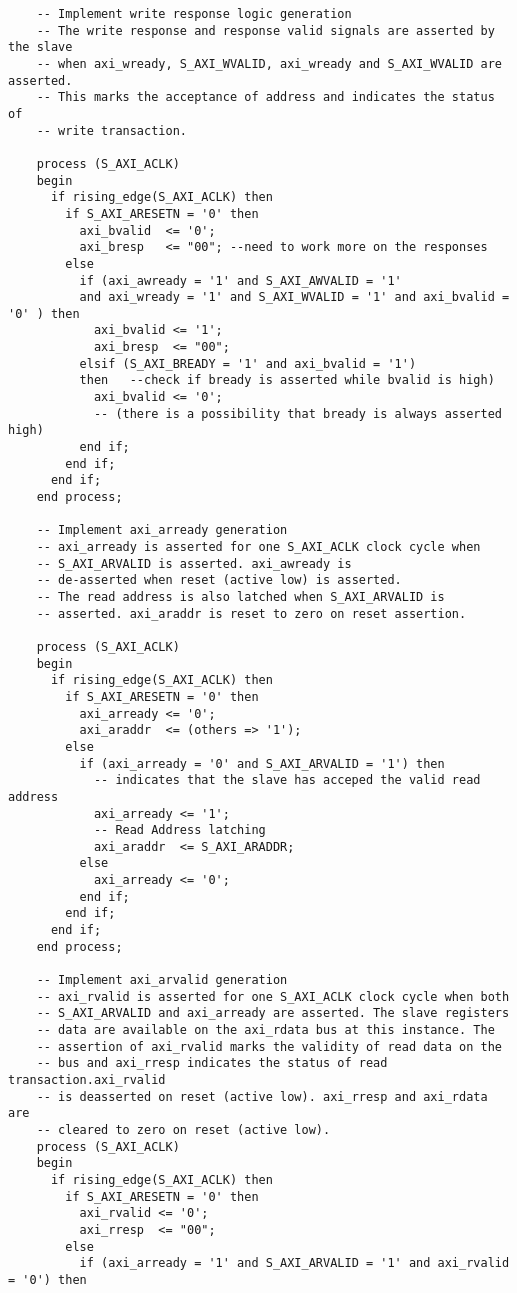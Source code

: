 \begin{lstlisting}
	-- Implement write response logic generation
	-- The write response and response valid signals are asserted by the slave 
	-- when axi_wready, S_AXI_WVALID, axi_wready and S_AXI_WVALID are asserted.  
	-- This marks the acceptance of address and indicates the status of 
	-- write transaction.

	process (S_AXI_ACLK)
	begin
	  if rising_edge(S_AXI_ACLK) then 
	    if S_AXI_ARESETN = '0' then
	      axi_bvalid  <= '0';
	      axi_bresp   <= "00"; --need to work more on the responses
	    else
	      if (axi_awready = '1' and S_AXI_AWVALID = '1' 
          and axi_wready = '1' and S_AXI_WVALID = '1' and axi_bvalid = '0' ) then
	        axi_bvalid <= '1';
	        axi_bresp  <= "00"; 
	      elsif (S_AXI_BREADY = '1' and axi_bvalid = '1') 
          then   --check if bready is asserted while bvalid is high)
	        axi_bvalid <= '0';                                 
            -- (there is a possibility that bready is always asserted high)
	      end if;
	    end if;
	  end if;                   
	end process; 

	-- Implement axi_arready generation
	-- axi_arready is asserted for one S_AXI_ACLK clock cycle when
	-- S_AXI_ARVALID is asserted. axi_awready is 
	-- de-asserted when reset (active low) is asserted. 
	-- The read address is also latched when S_AXI_ARVALID is 
	-- asserted. axi_araddr is reset to zero on reset assertion.

	process (S_AXI_ACLK)
	begin
	  if rising_edge(S_AXI_ACLK) then 
	    if S_AXI_ARESETN = '0' then
	      axi_arready <= '0';
	      axi_araddr  <= (others => '1');
	    else
	      if (axi_arready = '0' and S_AXI_ARVALID = '1') then
	        -- indicates that the slave has acceped the valid read address
	        axi_arready <= '1';
	        -- Read Address latching 
	        axi_araddr  <= S_AXI_ARADDR;           
	      else
	        axi_arready <= '0';
	      end if;
	    end if;
	  end if;                   
	end process; 

	-- Implement axi_arvalid generation
	-- axi_rvalid is asserted for one S_AXI_ACLK clock cycle when both 
	-- S_AXI_ARVALID and axi_arready are asserted. The slave registers 
	-- data are available on the axi_rdata bus at this instance. The 
	-- assertion of axi_rvalid marks the validity of read data on the 
	-- bus and axi_rresp indicates the status of read transaction.axi_rvalid 
	-- is deasserted on reset (active low). axi_rresp and axi_rdata are 
	-- cleared to zero on reset (active low).  
	process (S_AXI_ACLK)
	begin
	  if rising_edge(S_AXI_ACLK) then
	    if S_AXI_ARESETN = '0' then
	      axi_rvalid <= '0';
	      axi_rresp  <= "00";
	    else
	      if (axi_arready = '1' and S_AXI_ARVALID = '1' and axi_rvalid = '0') then
          

\end{lstlisting}
